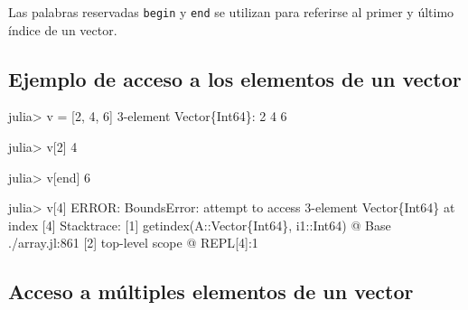 \documentclass[
  letterpaper,
  DIV=11,
  numbers=noendperiod]{scrreprt}
\newenvironment{Shaded}{\begin{snugshade}}{\end{snugshade}}
\newcommand{\BuiltInTok}[1]{\textcolor[rgb]{0.00,0.23,0.31}{#1}}
\newcommand{\DataTypeTok}[1]{\textcolor[rgb]{0.68,0.00,0.00}{#1}}
\newcommand{\FloatTok}[1]{\textcolor[rgb]{0.68,0.00,0.00}{#1}}
\newcommand{\FunctionTok}[1]{\textcolor[rgb]{0.28,0.35,0.67}{#1}}
\newcommand{\KeywordTok}[1]{\textcolor[rgb]{0.00,0.23,0.31}{#1}}
\newcommand{\NormalTok}[1]{\textcolor[rgb]{0.00,0.23,0.31}{#1}}
\newcommand{\OperatorTok}[1]{\textcolor[rgb]{0.37,0.37,0.37}{#1}}
\begin{document}
Las palabras reservadas \texttt{begin} y \texttt{end} se utilizan para
referirse al primer y último índice de un vector.

\hypertarget{ejemplo-de-acceso-a-los-elementos-de-un-vector}{%
\subsection{Ejemplo de acceso a los elementos de un
vector}\label{ejemplo-de-acceso-a-los-elementos-de-un-vector}}

\begin{Shaded}
\begin{Highlighting}[]
\NormalTok{julia}\OperatorTok{\textgreater{}}\NormalTok{ v }\OperatorTok{=}\NormalTok{ [}\FloatTok{2}\NormalTok{, }\FloatTok{4}\NormalTok{, }\FloatTok{6}\NormalTok{]}
\FloatTok{3}\OperatorTok{{-}}\NormalTok{element }\DataTypeTok{Vector}\NormalTok{\{}\DataTypeTok{Int64}\NormalTok{\}}\OperatorTok{:}
 \FloatTok{2}
 \FloatTok{4}
 \FloatTok{6}

\NormalTok{julia}\OperatorTok{\textgreater{}}\NormalTok{ v[}\FloatTok{2}\NormalTok{]}
\FloatTok{4}

\NormalTok{julia}\OperatorTok{\textgreater{}}\NormalTok{ v[}\KeywordTok{end}\NormalTok{]}
\FloatTok{6}

\NormalTok{julia}\OperatorTok{\textgreater{}}\NormalTok{ v[}\FloatTok{4}\NormalTok{]}
\NormalTok{ERROR}\OperatorTok{:} \DataTypeTok{BoundsError}\OperatorTok{:}\NormalTok{ attempt to access }\FloatTok{3}\OperatorTok{{-}}\NormalTok{element }\DataTypeTok{Vector}\NormalTok{\{}\DataTypeTok{Int64}\NormalTok{\} at index [}\FloatTok{4}\NormalTok{]}
\NormalTok{Stacktrace}\OperatorTok{:}
\NormalTok{ [}\FloatTok{1}\NormalTok{] }\FunctionTok{getindex}\NormalTok{(A}\OperatorTok{::}\DataTypeTok{Vector\{Int64\}}\NormalTok{, i1}\OperatorTok{::}\DataTypeTok{Int64}\NormalTok{)}
\NormalTok{   @ }\BuiltInTok{Base} \OperatorTok{./}\NormalTok{array.jl}\OperatorTok{:}\FloatTok{861}
\NormalTok{ [}\FloatTok{2}\NormalTok{] top}\OperatorTok{{-}}\NormalTok{level scope}
\NormalTok{   @ }\BuiltInTok{REPL}\NormalTok{[}\FloatTok{4}\NormalTok{]}\OperatorTok{:}\FloatTok{1}
\end{Highlighting}
\end{Shaded}

\hypertarget{acceso-a-muxfaltiples-elementos-de-un-vector}{%
\subsection{Acceso a múltiples elementos de un
vector}\label{acceso-a-muxfaltiples-elementos-de-un-vector}}
\end{document}
